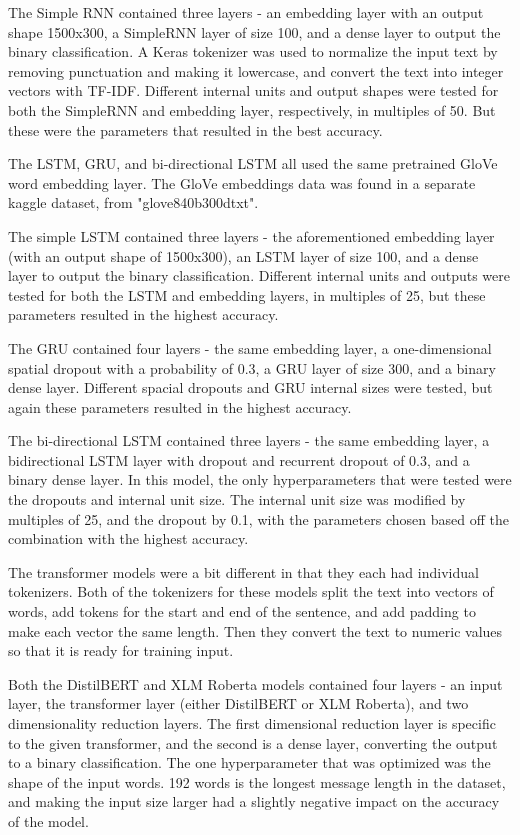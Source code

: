 \documentclass{article}
\begin{document}
The Simple RNN contained three layers - an embedding layer with an output shape 1500x300, a SimpleRNN layer of size 100, and a dense layer to output the binary classification. A Keras tokenizer was used to normalize the input text by removing punctuation and making it lowercase, and convert the text into integer vectors with TF-IDF. Different internal units and output shapes were tested for both the SimpleRNN and embedding layer, respectively, in multiples of 50. But these were the parameters that resulted in the best accuracy.

The LSTM, GRU, and bi-directional LSTM all used the same pretrained GloVe word embedding layer. The GloVe embeddings data was found in a separate kaggle dataset, from "glove840b300dtxt".

The simple LSTM contained three layers - the aforementioned embedding layer (with an output shape of 1500x300), an LSTM layer of size 100, and a dense layer to output the binary classification. Different internal units and outputs were tested for both the LSTM and embedding layers, in multiples of 25, but these parameters resulted in the highest accuracy.

The GRU contained four layers - the same embedding layer, a one-dimensional spatial dropout with a probability of 0.3, a GRU layer of size 300, and a binary dense layer. Different spacial dropouts and GRU internal sizes were tested, but again these parameters resulted in the highest accuracy.

The bi-directional LSTM contained three layers - the same embedding layer, a bidirectional LSTM layer with dropout and recurrent dropout of 0.3, and a binary dense layer. In this model, the only hyperparameters that were tested were the dropouts and internal unit size. The internal unit size was modified by multiples of 25, and the dropout by 0.1, with the parameters chosen based off the combination with the highest accuracy.

The transformer models were a bit different in that they each had individual tokenizers. Both of the tokenizers for these models split the text into vectors of words, add tokens for the start and end of the sentence, and add padding to make each vector the same length. Then they convert the text to numeric values so that it is ready for training input.

Both the DistilBERT and XLM Roberta models contained four layers - an input layer, the transformer layer (either DistilBERT or XLM Roberta), and two dimensionality reduction layers. The first dimensional reduction layer is specific to the given transformer, and the second is a dense layer, converting the output to a binary classification. The one hyperparameter that was optimized was the shape of the input words. 192 words is the longest message length in the dataset, and making the input size larger had a slightly negative impact on the accuracy of the model.
\end{document}
